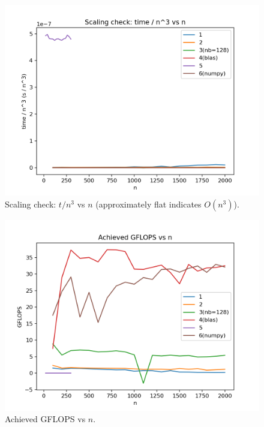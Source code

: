 \documentclass[11pt,a4paper]{article}
\begin{document}
	\begin{figure}[H]
		\centering
		\includegraphics[width=0.82\linewidth]{plots/time_over_n3.png}
		\caption{Scaling check: $t/n^3$ vs $n$ (approximately flat indicates $O(n^3)$).}
		\label{fig:scaling}
	\end{figure}
	
	\begin{figure}[H]
		\centering
		\includegraphics[width=0.82\linewidth]{plots/gflops_vs_n.png}
		\caption{Achieved GFLOPS vs $n$.}
		\label{fig:gflops}
	\end{figure}
	
\end{document}

